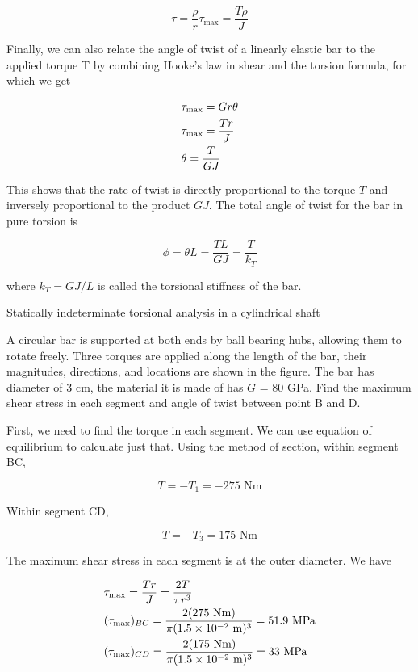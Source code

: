 \documentclass[a4paper,openany,nobib]{tufte-book}
\begin{document}
$$\tau  = \frac{\rho }{r}\tau _{\max } = \frac{T\rho }{J}$$

Finally, we can also relate the angle of twist of a linearly elastic bar
to the applied torque T by combining Hooke's law in shear and the
torsion formula, for which we get

$$\begin{gathered}
    \tau _{\max } = Gr\theta \\
    \tau _{\max } = \frac{Tr}{J} \hfill \\
    \theta  = \frac{T}{GJ} \hfill \\ 
  \end{gathered}$$

This shows that the rate of twist is directly proportional to the torque
\(T\) and inversely proportional to the product \(GJ\). The total angle of
twist for the bar in pure torsion is

$$\phi  = \theta L = \frac{TL}{GJ} = \frac{T}{k_T}$$

where \(k_T = GJ/L\) is called the torsional stiffness of the bar.

Statically indeterminate torsional analysis in a cylindrical shaft

A circular bar is supported at both ends by ball bearing hubs, allowing
them to rotate freely. Three torques are applied along the length of the
bar, their magnitudes, directions, and locations are shown in the
figure. The bar has diameter of 3 cm, the material it is made of has \(G\)
= 80 GPa. Find the maximum shear stress in each segment and angle of
twist between point B and D.


First, we need to find the torque in each segment. We can use equation
of equilibrium to calculate just that. Using the method of section,
within segment BC,

$$T =  - T_1 =  - 275\text{ Nm}$$

Within segment CD,

$$T =  - T_3 = 175\text{ Nm}$$

The maximum shear stress in each segment is at the outer diameter. We
have

$$\begin{gathered}
  \tau _{\max } = \frac{Tr}{J} = \frac{2T}{\pi r^3} \hfill \\
  (\tau _{\max })_{BC} = \frac{2(275\text{ Nm})}{\pi (1.5 \times 10^{ - 2}\text{ m})^3} = 51.9\text{ MPa} \hfill \\
  (\tau _{\max })_{CD} = \frac{2(175\text{ Nm})}{\pi (1.5 \times 10^{ - 2}\text{ m})^3} = 33\text{ MPa} \hfill \\ 
\end{gathered}$$
\end{document}
